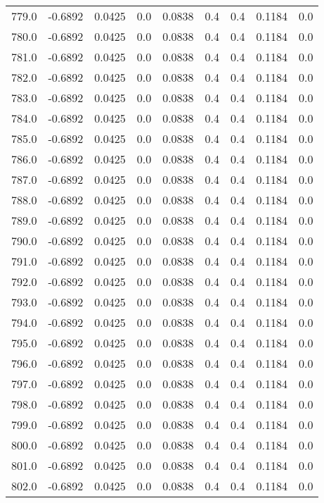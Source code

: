 \begin{longtable}{lrrrrrrrr}
779.0 & -0.6892 & 0.0425 & 0.0 & 0.0838 & 0.4 & 0.4 & 0.1184 & 0.0 \\
780.0 & -0.6892 & 0.0425 & 0.0 & 0.0838 & 0.4 & 0.4 & 0.1184 & 0.0 \\
781.0 & -0.6892 & 0.0425 & 0.0 & 0.0838 & 0.4 & 0.4 & 0.1184 & 0.0 \\
782.0 & -0.6892 & 0.0425 & 0.0 & 0.0838 & 0.4 & 0.4 & 0.1184 & 0.0 \\
783.0 & -0.6892 & 0.0425 & 0.0 & 0.0838 & 0.4 & 0.4 & 0.1184 & 0.0 \\
784.0 & -0.6892 & 0.0425 & 0.0 & 0.0838 & 0.4 & 0.4 & 0.1184 & 0.0 \\
785.0 & -0.6892 & 0.0425 & 0.0 & 0.0838 & 0.4 & 0.4 & 0.1184 & 0.0 \\
786.0 & -0.6892 & 0.0425 & 0.0 & 0.0838 & 0.4 & 0.4 & 0.1184 & 0.0 \\
787.0 & -0.6892 & 0.0425 & 0.0 & 0.0838 & 0.4 & 0.4 & 0.1184 & 0.0 \\
788.0 & -0.6892 & 0.0425 & 0.0 & 0.0838 & 0.4 & 0.4 & 0.1184 & 0.0 \\
789.0 & -0.6892 & 0.0425 & 0.0 & 0.0838 & 0.4 & 0.4 & 0.1184 & 0.0 \\
790.0 & -0.6892 & 0.0425 & 0.0 & 0.0838 & 0.4 & 0.4 & 0.1184 & 0.0 \\
791.0 & -0.6892 & 0.0425 & 0.0 & 0.0838 & 0.4 & 0.4 & 0.1184 & 0.0 \\
792.0 & -0.6892 & 0.0425 & 0.0 & 0.0838 & 0.4 & 0.4 & 0.1184 & 0.0 \\
793.0 & -0.6892 & 0.0425 & 0.0 & 0.0838 & 0.4 & 0.4 & 0.1184 & 0.0 \\
794.0 & -0.6892 & 0.0425 & 0.0 & 0.0838 & 0.4 & 0.4 & 0.1184 & 0.0 \\
795.0 & -0.6892 & 0.0425 & 0.0 & 0.0838 & 0.4 & 0.4 & 0.1184 & 0.0 \\
796.0 & -0.6892 & 0.0425 & 0.0 & 0.0838 & 0.4 & 0.4 & 0.1184 & 0.0 \\
797.0 & -0.6892 & 0.0425 & 0.0 & 0.0838 & 0.4 & 0.4 & 0.1184 & 0.0 \\
798.0 & -0.6892 & 0.0425 & 0.0 & 0.0838 & 0.4 & 0.4 & 0.1184 & 0.0 \\
799.0 & -0.6892 & 0.0425 & 0.0 & 0.0838 & 0.4 & 0.4 & 0.1184 & 0.0 \\
800.0 & -0.6892 & 0.0425 & 0.0 & 0.0838 & 0.4 & 0.4 & 0.1184 & 0.0 \\
801.0 & -0.6892 & 0.0425 & 0.0 & 0.0838 & 0.4 & 0.4 & 0.1184 & 0.0 \\
802.0 & -0.6892 & 0.0425 & 0.0 & 0.0838 & 0.4 & 0.4 & 0.1184 & 0.0 \\

\end{longtable}
